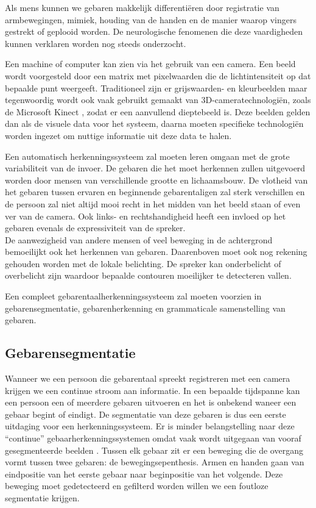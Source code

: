 \npar Als mens kunnen we gebaren makkelijk differenti\"eren door registratie van armbewegingen, mimiek, houding van de handen en de manier waarop vingers gestrekt of geplooid worden. De neurologische fenomenen die deze vaardigheden kunnen verklaren worden nog steeds onderzocht. 

\npar Een machine of computer kan zien via het gebruik van een camera. Een beeld wordt voorgesteld door een matrix met pixelwaarden die de lichtintensiteit op dat bepaalde punt weergeeft. Traditioneel zijn er grijswaarden- en kleurbeelden maar tegenwoordig wordt ook vaak gebruikt gemaakt van 3D-cameratechnologi\"en, zoals de Microsoft Kinect \cite{kuhn2011kinect}, zodat er een aanvullend dieptebeeld is. Deze beelden gelden dan als de visuele data voor het systeem, daarna moeten specifieke technologi\"en worden ingezet om nuttige informatie uit deze data te halen.

\npar Een automatisch herkenningssysteem zal moeten leren omgaan met de grote variabiliteit van de invoer. De gebaren die het moet herkennen zullen uitgevoerd worden door mensen van verschillende grootte en lichaamsbouw. De vlotheid van het gebaren tussen ervaren en beginnende gebarentaligen zal sterk verschillen en de persoon zal niet altijd mooi recht in het midden van het beeld staan of even ver van de camera. Ook links- en rechtshandigheid heeft een invloed op het gebaren evenals de expressiviteit van de spreker.
\\ De aanwezigheid van andere mensen of veel beweging in de achtergrond bemoeilijkt ook het herkennen van gebaren. Daarenboven moet ook nog rekening gehouden worden met de lokale belichting. De spreker kan onderbelicht of overbelicht zijn waardoor bepaalde contouren moeilijker te detecteren vallen.

\npar Een compleet gebarentaalherkenningssysteem zal moeten voorzien in gebarensegmentatie, gebarenherkenning en grammaticale samenstelling van gebaren.

\subsection{Gebarensegmentatie}
\npar Wanneer we een persoon die gebarentaal spreekt registreren met een camera krijgen we een continue stroom aan informatie. In een bepaalde tijdspanne kan een persoon een of meerdere gebaren uitvoeren en het is onbekend waneer een gebaar begint of eindigt. De segmentatie van deze gebaren is dus een eerste uitdaging voor een herkenningssysteem. Er is minder belangstelling naar deze ``continue'' gebaarherkenningssystemen omdat vaak wordt uitgegaan van vooraf gesegmenteerde beelden \cite{hmdb-manual-segm}.
\npar  Tussen elk gebaar zit er een beweging die de overgang vormt tussen twee gebaren: de bewegingsepenthesis. Armen en handen gaan van eindpositie van het eerste gebaar naar beginpositie van het volgende. \cite{movement-epenthesis} Deze beweging moet gedetecteerd en gefilterd worden willen we een foutloze segmentatie krijgen.

